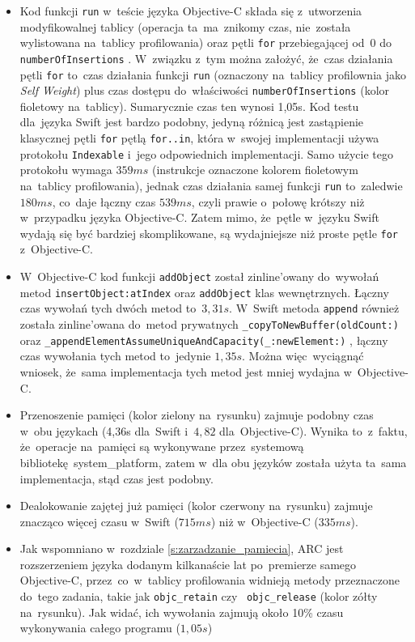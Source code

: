 \documentclass[mgr, shortabstract]{iithesis}
\newcommand{\swiftinline}[1]{
    \texttt{#1}
}
\newcommand{\objcinline}[1]{
    \texttt{#1}
}
\begin{document}
\begin{itemize}
    \item Kod funkcji \objcinline{run} w~teście języka Objective-C składa się z~utworzenia modyfikowalnej tablicy (operacja ta~ma~znikomy czas, nie~została wylistowana na~tablicy profilowania) oraz pętli \texttt{for} przebiegającej od~0 do~\objcinline{numberOfInsertions}. W~związku z~tym można założyć, że~czas działania pętli \texttt{for} to~czas działania funkcji \objcinline{run} (oznaczony na~tablicy profilownia jako \textit{Self Weight}) plus czas dostępu do~właściwości \objcinline{numberOfInsertions} (kolor fioletowy na~tablicy). Sumarycznie czas ten wynosi 1,05s. Kod testu dla~języka Swift jest bardzo podobny, jedyną różnicą jest zastąpienie klasycznej pętli \texttt{for} pętlą \texttt{for..in}, która w~swojej implementacji używa protokołu \swiftinline{Indexable} i~jego odpowiednich implementacji. Samo użycie tego protokołu wymaga $359ms$ (instrukcje oznaczone kolorem fioletowym na~tablicy profilowania), jednak czas działania samej funkcji \swiftinline{run} to~zaledwie $180ms$, co~daje łączny czas $539ms$, czyli prawie o~połowę krótszy niż w~przypadku języka Objective-C. Zatem mimo, że~pętle w~języku Swift wydają się być bardziej skomplikowane, są wydajniejsze niż proste pętle \texttt{for} z~Objective-C.
    \item W~Objective-C kod funkcji \objcinline{addObject} został zinline'owany do~wywołań metod \objcinline{insertObject:atIndex} oraz \objcinline{addObject} klas wewnętrznych. Łączny czas wywołań tych dwóch metod to~$3,31s$. W~Swift metoda \swiftinline{append} również została zinline'owana do~metod prywatnych \swiftinline{_copyToNewBuffer(oldCount:)} oraz \swiftinline{_appendElementAssumeUniqueAndCapacity(_:newElement:)}, łączny czas wywołania tych metod to~jedynie $1,35s$. Można więc~wyciągnąć wniosek, że~sama implementacja tych metod jest mniej wydajna w~Objective-C.
    \item Przenoszenie pamięci (kolor zielony na~rysunku) zajmuje podobny czas w~obu językach (4,36s dla~Swift i~$4,82$ dla~Objective-C). Wynika to~z~faktu, że~operacje na~pamięci są wykonywane przez~systemową bibliotekę \textsf{system\_platform}, zatem w~dla obu języków została użyta ta~sama implementacja, stąd czas jest podobny.
    \item Dealokowanie zajętej już pamięci (kolor czerwony na~rysunku) zajmuje znacząco więcej czasu w~Swift ($715ms$) niż w~Objective-C ($335ms$).
    \item Jak wspomniano w~rozdziale \ref{s:zarzadzanie_pamiecia}, ARC jest rozszerzeniem języka dodanym kilkanaście lat po~premierze samego Objective-C, przez~co~w~tablicy profilowania widnieją metody przeznaczone do~tego zadania, takie jak \objcinline{objc_retain} czy~\objcinline{objc_release} (kolor zółty na~rysunku). Jak widać, ich wywołania zajmują około 10\% czasu wykonywania całego programu ($1,05s$)

\end{itemize}
\end{document}
